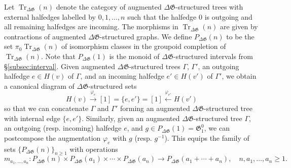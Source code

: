 \documentclass[english,11pt,leqno]{article}
\def\Gen{\mathfrak{G}}
\def\on{\operatorname}
\def\lra{\longrightarrow}
\def\lla{\longleftarrow}
\def\Tr{\on{Tr}}
\def\DG{ {\Delta \Gen}}
\theoremstyle{definition}
\theoremstyle{remark}
\numberwithin{equation}{section}
\begin{document}
Let $\Tr_{\DG}(n)$ denote the category of augmented $\DG$-structured trees with
external halfedges labelled by $0,1,\dots,n$ such that the halfedge $0$ is outgoing and all
remaining halfedges are incoming. The morphisms in $\Tr_{\DG}(n)$ are given by contractions of
augmented $\DG$-structured graphs. We define $P_{\DG}(n)$ to be the set $\pi_0 \Tr_{\DG}(n)$ of
isomorphism classes in the groupoid completion of $\Tr_{\DG}(n)$. Note that $P_{\DG}(1)$ is the
monoid of $\DG$-structured intervals from \S \ref{subsec:interval}. Given augmented $\DG$-structured trees
$\Gamma$, $\Gamma'$, an outgoing halfedge $e \in H(v)$ of $\Gamma$, and an incoming halfedge $e' \in
H(v')$ of $\Gamma'$, we obtain a canonical diagram of $\DG$-structured sets
\[
	H(v) \overset{\varphi_e}{\lra} [1] = \{e,e'\} = [1] \overset{\varphi_{e'}}{\lla} H(v')
\]
so that we can concatenate $\Gamma$ and $\Gamma'$ forming an augmented $\DG$-structured tree with
internal edge $\{e,e'\}$. Similarly, given an augmented $\DG$-structured tree $\Gamma$, an outgoing (resp.
incoming) halfedge $e$, and $g \in P_{\DG}(1) = \Gen_1^0$, we can postcompose the augmentation
$\varphi_e$ with $g$ (resp. $g^{-1}$). This equips the family of sets $\{P_\DG(n)\}_{n\geq 1}$
with operations
\[
 m_{a_1, \dots, a_n}:  P_\DG(n) \times P_\DG(a_1)\times \cdots \times P_\DG(a_n) \lra 
 P_\DG(a_1+\cdots + a_n), \quad n, a_1, \dots, a_n \geq 1. 
\]
\end{document}
